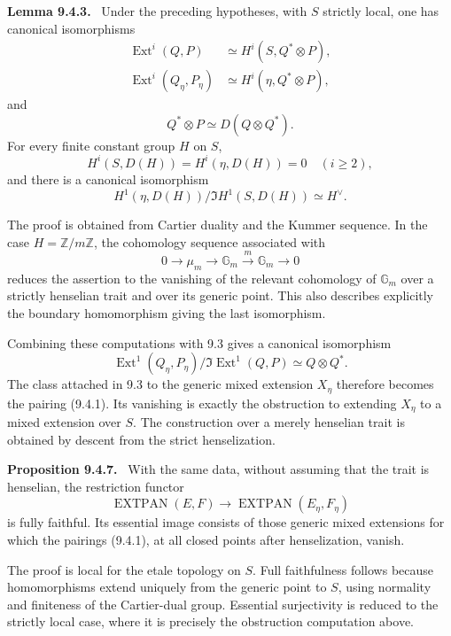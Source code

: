 \documentclass[11pt]{article}
\newcommand{\Ext}{\operatorname{Ext}}
\newcommand{\Z}{\mathbb Z}
\newcommand{\Gm}{\mathbb G_m}
\newcommand{\EXTPAN}{\operatorname{EXTPAN}}
\newenvironment{statement}[1]{\par\medskip\noindent\textbf{#1.}\ }{\par\medskip}
\begin{document}
\begin{statement}{Lemma 9.4.3}
Under the preceding hypotheses, with \(S\) strictly local, one has canonical isomorphisms
\begin{align*}
        \Ext^i(Q,P)&\simeq H^i(S,Q^*\otimes P),\\
        \Ext^i(Q_\eta,P_\eta)&\simeq H^i(\eta,Q^*\otimes P),
\end{align*}
and
\[
        Q^*\otimes P\simeq D(Q\otimes Q^*).
\]
For every finite constant group \(H\) on \(S\),
\[
        H^i(S,D(H))=H^i(\eta,D(H))=0\quad (i\ge2),
\]
and there is a canonical isomorphism
\[
        H^1(\eta,D(H))/\Im H^1(S,D(H))\simeq H^\vee.
\]
\end{statement}

The proof is obtained from Cartier duality and the Kummer sequence.  In the case \(H=\Z/m\Z\), the cohomology sequence associated with
\[
        0\longrightarrow\mu_m\longrightarrow\Gm\xrightarrow{m}\Gm\longrightarrow0
\]
reduces the assertion to the vanishing of the relevant cohomology of \(\Gm\) over a strictly henselian trait and over its generic point.  This also describes explicitly the boundary homomorphism giving the last isomorphism.

Combining these computations with 9.3 gives a canonical isomorphism
\begin{equation}\tag{9.4.5}
        \Ext^1(Q_\eta,P_\eta)/\Im\Ext^1(Q,P)
        \simeq Q\otimes Q^*.
\end{equation}
The class attached in 9.3 to the generic mixed extension \(X_\eta\) therefore becomes the pairing (9.4.1).  Its vanishing is exactly the obstruction to extending \(X_\eta\) to a mixed extension over \(S\).  The construction over a merely henselian trait is obtained by descent from the strict henselization.

\begin{statement}{Proposition 9.4.7}
With the same data, without assuming that the trait is henselian, the restriction functor
\[
        \EXTPAN(E,F)\longrightarrow\EXTPAN(E_\eta,F_\eta)
\]
is fully faithful.  Its essential image consists of those generic mixed extensions for which the pairings (9.4.1), at all closed points after henselization, vanish.
\end{statement}

The proof is local for the etale topology on \(S\).  Full faithfulness follows because homomorphisms extend uniquely from the generic point to \(S\), using normality and finiteness of the Cartier-dual group.  Essential surjectivity is reduced to the strictly local case, where it is precisely the obstruction computation above.
\end{document}

